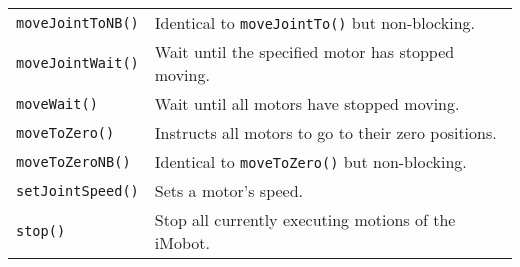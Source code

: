 \begin{table}[!hp]
\begin{center}
\begin{tabular}{p{58 mm}p{97 mm}}
\texttt{moveJointToNB()} & Identical to \texttt{moveJointTo()} but non-blocking. \\
\texttt{moveJointWait()} & Wait until the specified motor has stopped moving. \\
\texttt{moveWait()} & Wait until all motors have stopped moving. \\
\texttt{moveToZero()} & Instructs all motors to go to their zero positions. \\
\texttt{moveToZeroNB()} & Identical to \texttt{moveToZero()} but non-blocking. \\
\texttt{setJointSpeed()} & Sets a motor's speed. \\
\texttt{stop()} & Stop all currently executing motions of the iMobot. \\
\hline
\end{tabular}
\end{center}
\label{mobilec_api_cbinary}
\end{table}

\newpage
















